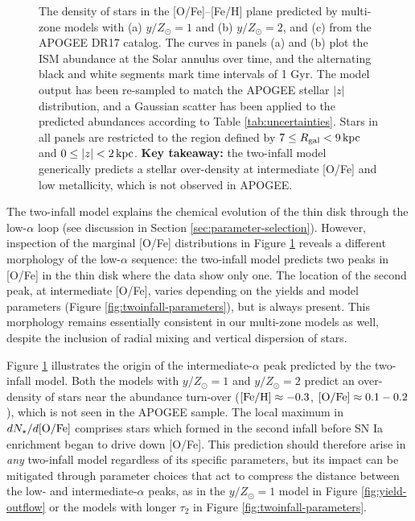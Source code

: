 \documentclass[twocolumn,twocolappendix,linenumbers]{aastex631}
\newcommand{\mathFeH}{{\rm [Fe/H]}}
\newcommand{\mathOFe}{{\rm [O/Fe]}}
\newcommand{\kpc}{\,{\rm kpc}}
\begin{document}
\begin{figure}
    \caption{The density of stars in the [O/Fe]--[Fe/H] plane predicted by multi-zone models with (a) $y/Z_\odot=1$ and (b) $y/Z_\odot=2$, and (c) from the APOGEE DR17 catalog. The curves in panels (a) and (b) plot the ISM abundance at the Solar annulus over time, and the alternating black and white segments mark time intervals of {1 Gyr}. The model output has been re-sampled to match the APOGEE stellar $|z|$ distribution, and a Gaussian scatter has been applied to the predicted abundances according to Table \ref{tab:uncertainties}. Stars in all panels are restricted to the region defined by $7\leq R_{\rm gal}< 9\kpc$ and $0\leq|z|<2\kpc$. {\bf Key takeaway:} the two-infall model generically predicts a stellar over-density at intermediate [O/Fe] and low metallicity, which is not observed in APOGEE.}
    \label{fig:ofe-feh-density}
\end{figure}

The two-infall model explains the chemical evolution of the thin disk through the low-$\alpha$ loop (see discussion in Section \ref{sec:parameter-selection}). However, inspection of the marginal [O/Fe] distributions in Figure \ref{fig:ofe-feh-density} reveals a different morphology of the low-$\alpha$ sequence: the two-infall model predicts two peaks in [O/Fe] in the thin disk where the data show only one. The location of the second peak, at intermediate [O/Fe], varies depending on the yields and model parameters (Figure \ref{fig:twoinfall-parameters}), but is always present. This morphology remains essentially consistent in our multi-zone models as well, despite the inclusion of radial mixing and vertical dispersion of stars.

Figure \ref{fig:ofe-feh-density} illustrates the origin of the intermediate-$\alpha$ peak predicted by the two-infall model. Both the models with $y/Z_\odot=1$ and $y/Z_\odot=2$ predict an over-density of stars near the abundance turn-over ($\mathFeH\approx-0.3$, $\mathOFe\approx0.1-0.2$), which is not seen in the APOGEE sample. The local maximum in $dN_\star/d\mathOFe$ comprises stars which formed in the second infall before SN Ia enrichment began to drive down [O/Fe]. This prediction should therefore arise in {\it any} two-infall model regardless of its specific parameters, but its impact can be mitigated through parameter choices that act to compress the distance between the low- and intermediate-$\alpha$ peaks, as in the $y/Z_\odot=1$ model in Figure \ref{fig:yield-outflow} or the models with longer $\tau_2$ in Figure \ref{fig:twoinfall-parameters}.
\end{document}
